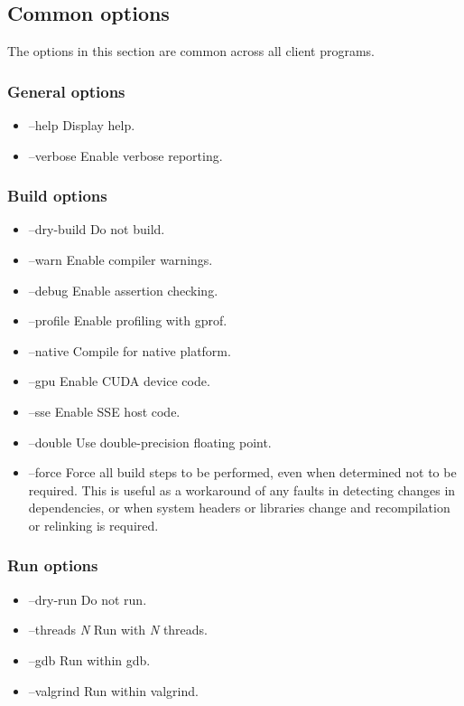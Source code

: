 \subsection{Common options\label{Common_options}}

The options in this section are common across all client programs.

\subsubsection{General options}
\begin{itemize}
\item {\sf --help} Display help.
\item {\sf --verbose} Enable verbose reporting.
\end{itemize}

\subsubsection{Build options}
\begin{itemize}
\item {\sf --dry-build} Do not build.
\item {\sf --warn} Enable compiler warnings.
\item {\sf --debug} Enable assertion checking.
\item {\sf --profile} Enable profiling with {\sf gprof}.
\item {\sf --native} Compile for native platform.
\item {\sf --gpu} Enable CUDA device code.
\item {\sf --sse} Enable SSE host code.
\item {\sf --double} Use double-precision floating point.
\item {\sf --force} Force all build steps to be performed, even when
  determined not to be required. This is useful as a workaround of any faults
  in detecting changes in dependencies, or when system headers or libraries
  change and recompilation or relinking is required.
\end{itemize}

\subsubsection{Run options}
\begin{itemize}
\item {\sf --dry-run} Do not run.
\item {\sf --threads \textit{N}} Run with {\sf \textit{N}} threads.
\item {\sf --gdb} Run within {\sf gdb}.
\item {\sf --valgrind} Run within {\sf valgrind}.
\end{itemize}
